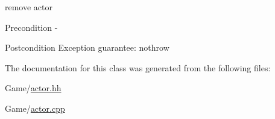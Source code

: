 remove actor 

\begin{DoxyPrecond}{Precondition}
-\/ 
\end{DoxyPrecond}
\begin{DoxyPostcond}{Postcondition}
Exception guarantee\-: nothrow 
\end{DoxyPostcond}


The documentation for this class was generated from the following files\-:\begin{DoxyCompactItemize}
\item 
Game/\hyperlink{actor_8hh}{actor.\-hh}\item 
Game/\hyperlink{actor_8cpp}{actor.\-cpp}\end{DoxyCompactItemize}
